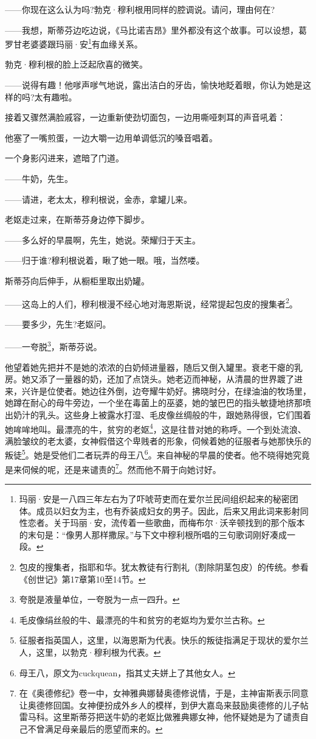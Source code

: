 \par ——你现在这么认为吗?勃克·穆利根用同样的腔调说。请问，理由何在?
\par ——我想，斯蒂芬边吃边说，《马比诺吉昂》里外都没有这个故事。可以设想，葛罗甘老婆婆跟玛丽·安\footnote{玛丽·安是一八四三年左右为了吓唬苛吏而在爱尔兰民间组织起来的秘密团体。成员以妇女为主，也有乔装成妇女的男子。因此，后来又用此词来影射同性恋者。关于玛丽·安，流传着一些歌曲，而梅布尔·沃辛顿找到的那个版本的末句是：“像男人那样撒尿。”与下文中穆利根所唱的三句歌词刚好凑成一段。}有血缘关系。
\par 勃克·穆利根的脸上泛起欣喜的微笑。
\par ——说得有趣！他嗲声嗲气地说，露出洁白的牙齿，愉快地眨着眼，你认为她是这样的吗?太有趣啦。
\par 接着又骤然满脸戚容，一边重新使劲切面包，一边用嘶哑刺耳的声音吼着：
\par 他塞了一嘴煎蛋，一边大嚼一边用单调低沉的嗓音唱着。
\par 一个身影闪进来，遮暗了门道。
\par ——牛奶，先生。
\par ——请进，老太太，穆利根说，金赤，拿罐儿来。
\par 老妪走过来，在斯蒂芬身边停下脚步。
\par ——多么好的早晨啊，先生，她说。荣耀归于天主。
\par ——归于谁?穆利根说着，瞅了她一眼。哦，当然喽。
\par 斯蒂芬向后伸手，从橱柜里取出奶罐。
\par ——这岛上的人们，穆利根漫不经心地对海恩斯说，经常提起包皮的搜集者\footnote{包皮的搜集者，指耶和华。犹太教徒有行割礼（割除阴茎包皮）的传统。参看《创世记》第17章第10至14节。}。
\par ——要多少，先生?老妪问。
\par ——一夸脱\footnote{夸脱是液量单位，一夸脱为一点一四升。}，斯蒂芬说。
\par 他望着她先把并不是她的浓浓的白奶倾进量器，随后又倒入罐里。衰老干瘪的乳房。她又添了一量器的奶，还加了点饶头。她老迈而神秘，从清晨的世界踱了进来，兴许是位使者。她边往外倒，边夸耀牛奶好。拂晓时分，在绿油油的牧场里，她蹲在耐心的母牛旁边，一个坐在毒菌上的巫婆，她的皱巴巴的指头敏捷地挤那喷出奶汁的乳头。这些身上被露水打湿、毛皮像丝绸般的牛，跟她熟得很，它们围着她哞哞地叫。最漂亮的牛，贫穷的老妪\footnote{毛皮像绢丝般的牛、最漂亮的牛和贫穷的老妪均为爱尔兰古称。}，这是往昔对她的称呼。一个到处流浪、满脸皱纹的老太婆，女神假借这个卑贱者的形象，伺候着她的征服者与她那快乐的叛徒\footnote{征服者指英国人，这里，以海恩斯为代表。快乐的叛徒指满足于现状的爱尔兰人，这里，以勃克·穆利根为代表。}。她是受他们二者玩弄的母王八\footnote{母王八，原文为cuckquean，指其丈夫姘上了其他女人。}。来自神秘的早晨的使者。他不晓得她究竟是来伺候的呢，还是来谴责的\footnote{在《奥德修纪》卷一中，女神雅典娜替奥德修说情，于是，主神宙斯表示同意让奥德修回国。女神便扮成外乡人的模样，到伊大嘉岛来鼓励奥德修的儿子帖雷马科。这里斯蒂芬把送牛奶的老妪比做雅典娜女神，他怀疑她是为了谴责自己不曾满足母亲最后的愿望而来的。}。然而他不屑于向她讨好。
